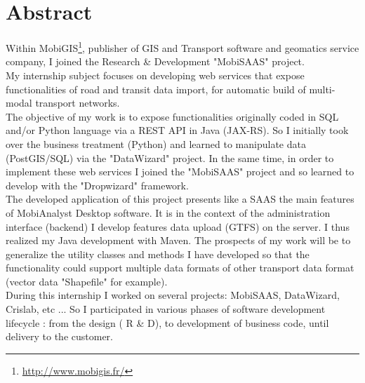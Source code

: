 \chapter*{Abstract}

Within MobiGIS\footnote{\url{http://www.mobigis.fr/}}, publisher of GIS and Transport software and geomatics service company, I joined the Research \& Development "MobiSAAS" project. \\

My internship subject focuses on developing web services that expose functionalities of road and transit data import, for automatic build of multi-modal transport networks. \\

The objective of my work is to expose functionalities originally coded in SQL and/or Python language via a REST API in Java (JAX-RS). So I initially took over the business treatment (Python) and learned to manipulate data (PostGIS/SQL) via the "DataWizard" project. In the same time, in order to implement these web services I joined the "MobiSAAS" project and so learned to develop with the "Dropwizard" framework. \\

The developed application of this project presents like a SAAS the main features of MobiAnalyst Desktop software. It is in the context of the administration interface (backend) I develop features data upload (GTFS) on the server. I thus realized my Java development with Maven. The prospects of my work will be to generalize the utility classes and methods I have developed so that the functionality could support multiple data formats of other transport data format (vector data "Shapefile" for example). \\

During this internship I worked on several projects: MobiSAAS, DataWizard, Crislab, etc ... So I participated in various phases of software development lifecycle : from the design ( R \& D), to development of business code, until delivery to the customer. \\
